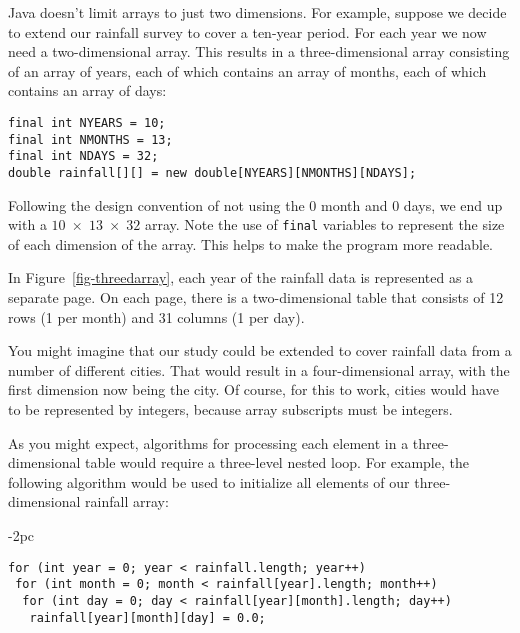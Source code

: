 
\noindent Java doesn't limit arrays to just two dimensions.  For example, suppose
we decide to extend our rainfall survey to cover a ten-year
period.  For each year we now need a two-dimensional array.  This
results in a three-dimensional array consisting of an array of years,
each of which contains an array of months, each of which contains an
array of days:


\begin{jjjlisting}
\begin{lstlisting}
final int NYEARS = 10;
final int NMONTHS = 13;
final int NDAYS = 32;
double rainfall[][] = new double[NYEARS][NMONTHS][NDAYS];
\end{lstlisting}
\end{jjjlisting}

\noindent Following the design convention of not using the
0 month and 0 days, we end up with a $10 \;\times\; 13 \;\times\; 32$ array.
Note the use of {\tt final} variables to represent the size of each
dimension of the array.  This helps to make the program more readable.

In Figure~\ref{fig-threedarray}, each year of the rainfall data is
represented as a separate page. On each page, there is a
two-dimensional table that consists of 12 rows (1 per month) and 31
columns (1 per day).


\begin{figure}[htb]
\end{figure}

You might imagine that our study could be extended to
cover rainfall data from a number of different cities.  That would
result in a four-dimensional array, with the first dimension now being
the city.   Of course, for this to work, cities would have to be
represented by integers, because array subscripts must be integers.


As you might expect, algorithms for processing each element
in a three-dimensional table would require a three-level
nested loop.  For example, the following algorithm would
be used to initialize all elements of our three-dimensional
rainfall array:

\begin{jjjlistingleft}[28pc]{-2pc}
\begin{lstlisting}
for (int year = 0; year < rainfall.length; year++)
 for (int month = 0; month < rainfall[year].length; month++)
  for (int day = 0; day < rainfall[year][month].length; day++)
   rainfall[year][month][day] = 0.0;
\end{lstlisting}
\end{jjjlistingleft}



